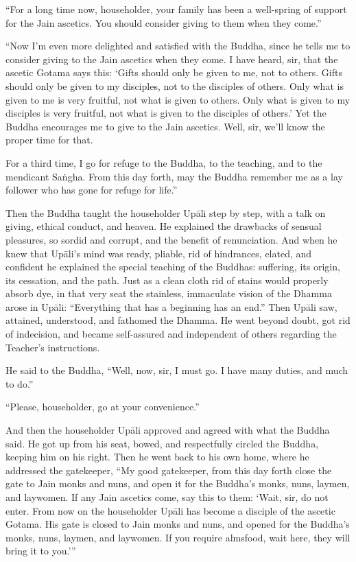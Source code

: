 \documentclass[12pt,openany]{book}%
\begin{document}
“For a long time now, householder, your family has been a well-spring of support for the Jain ascetics. You should consider giving to them when they come.” 

“Now I’m even more delighted and satisfied with the Buddha, since he tells me to consider giving to the Jain ascetics when they come. I have heard, sir, that the ascetic Gotama says this: ‘Gifts should only be given to me, not to others. Gifts should only be given to my disciples, not to the disciples of others. Only what is given to me is very fruitful, not what is given to others. Only what is given to my disciples is very fruitful, not what is given to the disciples of others.’ Yet the Buddha encourages me to give to the Jain ascetics. Well, sir, we’ll know the proper time for that. 

For a third time, I go for refuge to the Buddha, to the teaching, and to the mendicant \textsanskrit{Saṅgha}. From this day forth, may the Buddha remember me as a lay follower who has gone for refuge for life.” 

Then the Buddha taught the householder \textsanskrit{Upāli} step by step, with a talk on giving, ethical conduct, and heaven. He explained the drawbacks of sensual pleasures, so sordid and corrupt, and the benefit of renunciation. And when he knew that \textsanskrit{Upāli}’s mind was ready, pliable, rid of hindrances, elated, and confident he explained the special teaching of the Buddhas: suffering, its origin, its cessation, and the path. Just as a clean cloth rid of stains would properly absorb dye, in that very seat the stainless, immaculate vision of the Dhamma arose in \textsanskrit{Upāli}: “Everything that has a beginning has an end.” Then \textsanskrit{Upāli} saw, attained, understood, and fathomed the Dhamma. He went beyond doubt, got rid of indecision, and became self-assured and independent of others regarding the Teacher’s instructions. 

He said to the Buddha, “Well, now, sir, I must go. I have many duties, and much to do.” 

“Please, householder, go at your convenience.” 

And then the householder \textsanskrit{Upāli} approved and agreed with what the Buddha said. He got up from his seat, bowed, and respectfully circled the Buddha, keeping him on his right. Then he went back to his own home, where he addressed the gatekeeper, “My good gatekeeper, from this day forth close the gate to Jain monks and nuns, and open it for the Buddha’s monks, nuns, laymen, and laywomen. If any Jain ascetics come, say this to them: ‘Wait, sir, do not enter. From now on the householder \textsanskrit{Upāli} has become a disciple of the ascetic Gotama. His gate is closed to Jain monks and nuns, and opened for the Buddha’s monks, nuns, laymen, and laywomen. If you require almsfood, wait here, they will bring it to you.’” 
\end{document}

